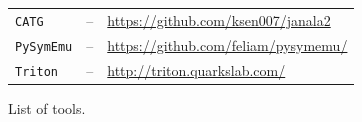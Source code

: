 \begin{figure}[t]
\begin{adjustbox}{width=1\columnwidth}
\begin{tabular}{| l || c || l |}
    {\tt CATG} & -- & \url{https://github.com/ksen007/janala2} \\
    {\tt PySymEmu} & -- & \url{https://github.com/feliam/pysymemu/} \\
    {\tt Triton} & -- & \url{http://triton.quarkslab.com/} \\
    \hline  
  \end{tabular}
  \end{adjustbox}
  \caption{List of tools.}
  \label{tab:symbolic-engines}
\end{figure}

